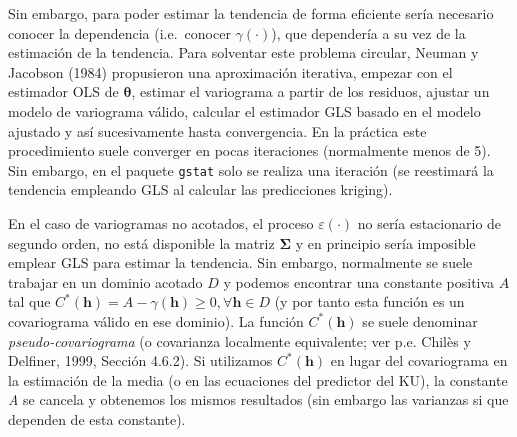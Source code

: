 \documentclass[
  spanish,
]{book}
\theoremstyle{break}
\theoremstyle{definition}
\theoremstyle{definition}
\theoremstyle{definition}
\theoremstyle{definition}
\theoremstyle{remark}
\begin{document}
Sin embargo, para poder estimar la tendencia de forma eficiente sería necesario conocer la dependencia (i.e.~conocer \(\gamma(\cdot)\)), que dependería a su vez de la estimación de la tendencia.
Para solventar este problema circular, Neuman y Jacobson (1984) propusieron una aproximación iterativa, empezar con el estimador OLS de \(\boldsymbol{\theta}\), estimar el variograma a partir de los residuos, ajustar un modelo de variograma válido, calcular el estimador GLS basado en el modelo ajustado y así sucesivamente hasta convergencia.
En la práctica este procedimiento suele converger en pocas iteraciones (normalmente menos de 5).
Sin embargo, en el paquete \texttt{gstat} solo se realiza una iteración (se reestimará la tendencia empleando GLS al calcular las predicciones kriging).

En el caso de variogramas no acotados, el proceso \(\varepsilon(\cdot)\) no sería estacionario de segundo orden, no está disponible la matriz \(\boldsymbol{\Sigma}\) y en principio sería imposible emplear GLS para estimar la tendencia.
Sin embargo, normalmente se suele trabajar en un dominio acotado \(D\) y podemos encontrar una constante positiva \(A\) tal que \(C^{\ast }(\mathbf{h})= A-\gamma(\mathbf{h})\geq 0,\forall \mathbf{h}\in D\) (y por tanto esta función es un covariograma válido en ese dominio).
La función \(C^{\ast }(\mathbf{h})\) se suele denominar \emph{pseudo-covariograma} (o covarianza localmente equivalente; ver p.e. Chilès y Delfiner, 1999, Sección 4.6.2).
Si utilizamos \(C^{\ast }(\mathbf{h})\) en lugar del covariograma en la estimación de la media (o en las ecuaciones del predictor del KU), la constante \emph{A} se cancela y obtenemos los mismos resultados (sin embargo las varianzas si que dependen de esta constante).
\end{document}
